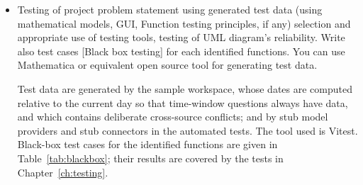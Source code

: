 \documentclass[oneside,a4paper,12pt]{report}
\begin{document}
\begin{appendices}
\begin{itemize}
\begin{figure}[!htbp]
\centering
{}
\caption{Functional dependency graph}
\label{fig:fdg}
\end{figure}

\item Testing of project problem statement using generated test data (using mathematical models, GUI, Function testing principles, if any) selection and appropriate use of testing tools, testing of UML diagram's reliability. Write also test cases [Black box testing] for each identified functions.
You can use Mathematica or equivalent open source tool for generating test data.

Test data are generated by the sample workspace, whose dates are computed relative to the current day so that time-window questions always have data, and which contains deliberate cross-source conflicts; and by stub model providers and stub connectors in the automated tests. The tool used is Vitest. Black-box test cases for the identified functions are given in Table~\ref{tab:blackbox}; their results are covered by the tests in Chapter~\ref{ch:testing}.


\end{itemize}
\end{appendices}
\end{document}

